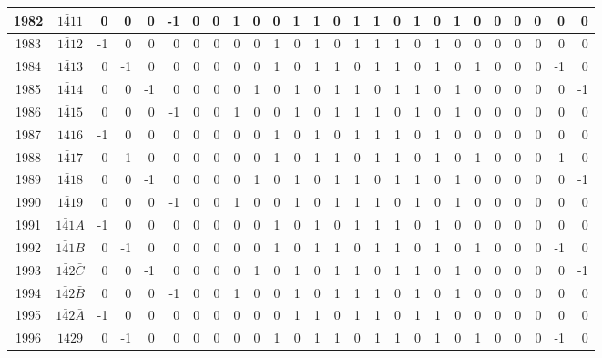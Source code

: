 \documentclass[12 pt]{article}%
\begin{document}
\begin{tiny}
\begin{centering}
\begin{longtable}{|c|c||rrrrrrrrrrrrrrrrrrrrrrrr|}
      \hline
      1982 & $1\bar411$ & 0 & 0 & 0 & -1 & 0 & 0 & 1 & 0 & 0 & 1 & 1 & 0 & 1 & 1 & 0 & 1 & 0 & 1 & 0 & 0 & 0 & 0 & 0 & 0 \\
      \hline
      1983 & $1\bar412$ & -1 & 0 & 0 & 0 & 0 & 0 & 0 & 0 & 1 & 0 & 1 & 0 & 1 & 1 & 1 & 0 & 1 & 0 & 0 & 0 & 0 & 0 & 0 & 0 \\
      \hline
      1984 & $1\bar413$ & 0 & -1 & 0 & 0 & 0 & 0 & 0 & 0 & 1 & 0 & 1 & 1 & 0 & 1 & 1 & 0 & 1 & 0 & 1 & 0 & 0 & 0 & -1 & 0 \\
      \hline
      1985 & $1\bar414$ & 0 & 0 & -1 & 0 & 0 & 0 & 0 & 1 & 0 & 1 & 0 & 1 & 1 & 0 & 1 & 1 & 0 & 1 & 0 & 0 & 0 & 0 & 0 & -1 \\
      \hline
      1986 & $1\bar415$ & 0 & 0 & 0 & -1 & 0 & 0 & 1 & 0 & 0 & 1 & 0 & 1 & 1 & 1 & 0 & 1 & 0 & 1 & 0 & 0 & 0 & 0 & 0 & 0 \\
      \hline
      1987 & $1\bar416$ & -1 & 0 & 0 & 0 & 0 & 0 & 0 & 0 & 1 & 0 & 1 & 0 & 1 & 1 & 1 & 0 & 1 & 0 & 0 & 0 & 0 & 0 & 0 & 0 \\
      \hline
      1988 & $1\bar417$ & 0 & -1 & 0 & 0 & 0 & 0 & 0 & 0 & 1 & 0 & 1 & 1 & 0 & 1 & 1 & 0 & 1 & 0 & 1 & 0 & 0 & 0 & -1 & 0 \\
      \hline
      1989 & $1\bar418$ & 0 & 0 & -1 & 0 & 0 & 0 & 0 & 1 & 0 & 1 & 0 & 1 & 1 & 0 & 1 & 1 & 0 & 1 & 0 & 0 & 0 & 0 & 0 & -1 \\
      \hline
      1990 & $1\bar419$ & 0 & 0 & 0 & -1 & 0 & 0 & 1 & 0 & 0 & 1 & 0 & 1 & 1 & 1 & 0 & 1 & 0 & 1 & 0 & 0 & 0 & 0 & 0 & 0 \\
      \hline
      1991 & $1\bar41A$ & -1 & 0 & 0 & 0 & 0 & 0 & 0 & 0 & 1 & 0 & 1 & 0 & 1 & 1 & 1 & 0 & 1 & 0 & 0 & 0 & 0 & 0 & 0 & 0 \\
      \hline
      1992 & $1\bar41B$ & 0 & -1 & 0 & 0 & 0 & 0 & 0 & 0 & 1 & 0 & 1 & 1 & 0 & 1 & 1 & 0 & 1 & 0 & 1 & 0 & 0 & 0 & -1 & 0 \\
      \hline
      1993 & $1\bar42\bar C$ & 0 & 0 & -1 & 0 & 0 & 0 & 0 & 1 & 0 & 1 & 0 & 1 & 1 & 0 & 1 & 1 & 0 & 1 & 0 & 0 & 0 & 0 & 0 & -1 \\
      \hline
      1994 & $1\bar42\bar B$ & 0 & 0 & 0 & -1 & 0 & 0 & 1 & 0 & 0 & 1 & 0 & 1 & 1 & 1 & 0 & 1 & 0 & 1 & 0 & 0 & 0 & 0 & 0 & 0 \\
      \hline
      1995 & $1\bar42\bar A$ & -1 & 0 & 0 & 0 & 0 & 0 & 0 & 0 & 0 & 1 & 1 & 0 & 1 & 1 & 0 & 1 & 1 & 0 & 0 & 0 & 0 & 0 & 0 & 0 \\
      \hline
      1996 & $1\bar42\bar9$ & 0 & -1 & 0 & 0 & 0 & 0 & 0 & 0 & 1 & 0 & 1 & 1 & 0 & 1 & 1 & 0 & 1 & 0 & 1 & 0 & 0 & 0 & -1 & 0 \\

\end{longtable}
\end{centering}
\end{tiny}
\end{document}
